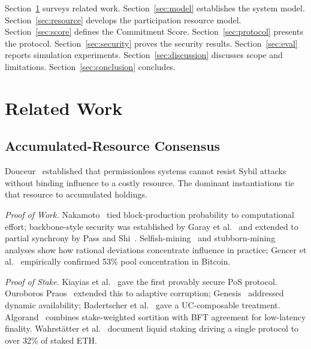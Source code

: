 \documentclass[10pt,journal,twoside]{IEEEtran}
\theoremstyle{remark}
\begin{document}
	Section~\ref{sec:related} surveys related work.
	Section~\ref{sec:model} establishes the system model.
	Section~\ref{sec:resource} develops the participation
	resource model.
	Section~\ref{sec:score} defines the Commitment Score.
	Section~\ref{sec:protocol} presents the protocol.
	Section~\ref{sec:security} proves the security results.
	Section~\ref{sec:eval} reports simulation experiments.
	Section~\ref{sec:discussion} discusses scope and limitations.
	Section~\ref{sec:conclusion} concludes.
	\section{Related Work}
	\label{sec:related}
	
	\subsection{Accumulated-Resource Consensus}
	\label{ssec:rw-accumulated}
	
	Douceur~\cite{douceur2002sybil} established that
	permissionless systems cannot resist Sybil attacks without
	binding influence to a costly resource.
	The dominant instantiations tie that resource to
	accumulated holdings.
	
	\emph{Proof of Work.}
	Nakamoto~\cite{nakamoto2008bitcoin} tied block-production
	probability to computational effort; backbone-style
	security was established by Garay et
	al.~\cite{garay2015bitcoin,garay2020analysis} and extended
	to partial synchrony by Pass and Shi~\cite{pass2017hybrid}.
	Selfish-mining~\cite{eyal2018selfish} and
	stubborn-mining~\cite{nayak2020stubborn} analyses show how
	rational deviations concentrate influence in practice;
	Gencer et al.~\cite{gencer2018decentralization} empirically
	confirmed 53\% pool concentration in Bitcoin.
	
	\emph{Proof of Stake.}
	Kiayias et al.~\cite{kiayias2017ouroboros} gave the first
	provably secure PoS protocol.
	Ouroboros Praos~\cite{david2018praos} extended this to
	adaptive corruption; Genesis~\cite{badertscher2018genesis}
	addressed dynamic availability; Badertscher et
	al.~\cite{badertscher2021stake} gave a UC-composable
	treatment.
	Algorand~\cite{gilad2017algorand} combines stake-weighted
	sortition with BFT agreement for low-latency finality.
	Wahrstätter et al.~\cite{wahrstatter2023lido} document
	liquid staking driving a single protocol to over 32\% of
	staked ETH.
	
\end{document}
